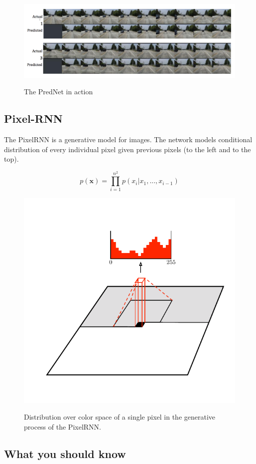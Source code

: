 \documentclass[main]{subfiles}
\begin{document}
 \begin{figure}[H]
	\centering
	\includegraphics[width=0.9\linewidth]{07_UnsupervisedAndSelfsupervisedLearning/figures/pred-net-out.png}
	\label{fig:pred-net-out}
	\caption{The PredNet in action}
\end{figure}

\subsection{Pixel-RNN}
The PixelRNN is a generative model for images. The network models conditional distribution of every individual
pixel given previous pixels (to the left and to the top).

\begin{equation}
    p(\mathbf{x}) = \prod_{i=1}^{n^2} p(x_i|x_1, ..., x_{i-1})
\end{equation}

 \begin{figure}[H]
	\centering
	\includegraphics[width=0.5\linewidth]{07_UnsupervisedAndSelfsupervisedLearning/figures/pixel-rnn.png}
	\label{fig:pred-net-out}
	\caption{Distribution over color space of a single pixel in the generative process of the PixelRNN.}
\end{figure}

\subsection{What you should know}
\end{document}
